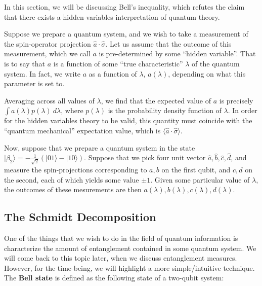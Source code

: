 \documentclass[
 10pt,
 amsmath,amssymb,
 notitlepage,
]{revtex4-1}
\begin{document}
In this section, we will be discussing Bell's inequality, which refutes the claim that there exists a hidden-variables interpretation of quantum theory.
\newline

Suppose we prepare a quantum system, and we wish to take a measurement of the spin-operator projection $\hat{a} \cdot \hat{\sigma}$. Let us assume that the outcome of this measurement, which we call $a$ is pre-determined
by some ``hidden variable''. That is to say that $a$ is a function of some ``true characteristic'' $\lambda$ of the quantum system. In fact, we write $a$ as a function of $\lambda$, $a(\lambda)$, depending on what this parameter is set to.
\newline

Averaging across all values of $\lambda$, we find that the expected value of $a$ is precisely $\int a(\lambda) p(\lambda) \ d\lambda$, where $p(\lambda)$ is the probability density function of $\lambda$. In order for the hidden variables
theory to be valid, this quantity must coincide with the ``quantum mechanical'' expectation value, which is $\langle \hat{a} \cdot \hat{\sigma} \rangle$.
\newline

Now, suppose that we prepare a quantum system in the state $|\beta_2\rangle = -\frac{1}{\sqrt{2}} (|01\rangle - |10\rangle)$. Suppose that we pick four unit vector $\hat{a}, \hat{b}, \hat{c}, \hat{d}$, and measure the
spin-projections corresponding to $a, b$ on the first qubit, and $c, d$ on the second, each of which yields some value $\pm 1$. Given some particular value of $\lambda$, the outcomes of these mesurements are then $a(\lambda), b(\lambda),
c(\lambda), d(\lambda)$.
\newline



\subsection{The Schmidt Decomposition}

\hrulefill

One of the things that we wish to do in the field of quantum information is characterize the amount of entanglement contained in some quantum system. We will come back to this topic later, when
we discuss entanglement measures. However, for the time-being, we will highlight a more simple/intuitive technique. The \textbf{Bell state} is defined as the following state of a two-qubit system:
\end{document}
